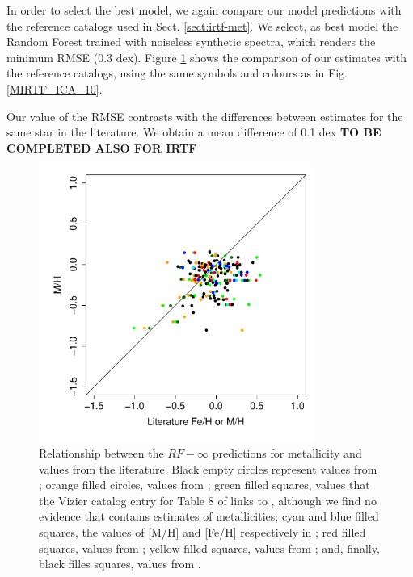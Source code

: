 In order to select the best model, we again compare our model
predictions with the reference catalogs used in
Sect. \ref{sect:irtf-met}. We select, as best model the Random Forest
trained with noiseless synthetic spectra, which renders the minimum
RMSE (0.3 dex). Figure \ref{fig:ipac_mt} shows the comparison of our
estimates with the reference catalogs, using the same symbols and
colours as in Fig. \ref{MIRTF_ICA_10}.

Our value of the RMSE contrasts with the differences between estimates
for the same star in the literature. We obtain a mean difference of
0.1 dex {\bf TO BE COMPLETED ALSO FOR IRTF}



\begin{figure}
 \begin{center} \includegraphics[width=9cm]{figs/ipac-figs/M-RFInf.pdf}

\caption{Relationship
 between the $RF-\infty$ predictions for metallicity and values from
 the literature.  Black empty circles represent values
 from \cite{cesetti} ; orange filled circles, values
 from \cite{NevesIII}; green filled squares, values that the Vizier
 catalog entry for Table 8 of \cite{NevesIII} links to \cite{Jao},
 although we find no evidence that \cite{Jao} contains estimates of
 metallicities; cyan and blue filled squares, the values of [M/H] and
 [Fe/H] respectively in \cite{RA2012}; red filled squares, values
 from \cite{Mann2015}; yellow filled squares, values
 from \cite{Newton2014}; and, finally, black filles squares, values
 from \cite{Gaidos2015}.}  \label{fig:ipac_mt} \end{center}
\end{figure}


